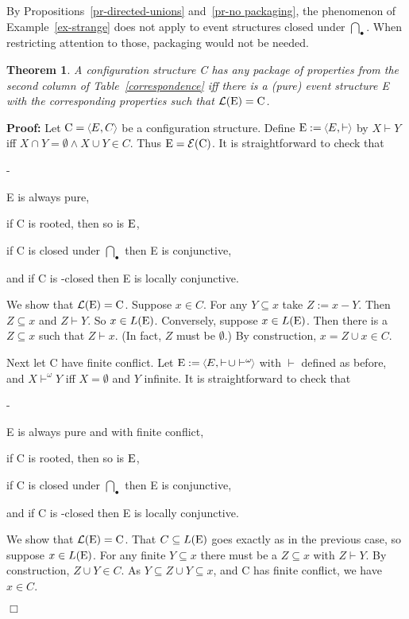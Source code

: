 \documentclass[twocolumn]{article}
\newtheorem{theo}{Theorem}
\newenvironment{theorem}[1]{\begin{theo} \rm \label{th-#1} }{\end{theo}}
\newenvironment{proof}{\begin{trivlist} \item[\hspace{\labelsep}\bf
Proof:]}{\hfill $\Box$\end{trivlist}}
\newcommand{\ex}[1]{Example~\ref{ex-#1}}
\newenvironment{itemise2}{\begin{list}{{\bf --}}{\leftmargin 15pt
                        \labelwidth\leftmargini\advance\labelwidth-\labelsep
                        \topsep 2pt \itemsep 1pt \parsep 1pt}}{\end{list}}
\newcommand{\turn}{\vdash}                              \newcommand{\dbigcup}{\bigcup_{\uparrow}}		\newcommand{\nbigcup}{\bigcup_{\bullet}}		\newcommand{\nbigcap}{\bigcap_{\bullet}}		\newcommand{\bbigcup}{\overline{\bigcup}}		\newcommand{\bbigcap}{\overline{\bigcap}}		\newcommand{\nbbigcap}{\bbigcap_{\bullet}}		\newcommand{\fbbigcup}{\overline{\bigcup}^f}		\newcommand{\bbbigcup}{\overline{\bigcup}^2}		\newcommand{\dcup}{~~\makebox[0pt]{\LARGE$\cdot$}\makebox[0pt]{$\cup$}~~}
\begin{document}
By Propositions~\ref{pr-directed-unions} and~\ref{pr-no packaging}, the phenomenon of \ex{strange}
does not apply to event structures closed under $\nbigcap$.  When
restricting attention to those, packaging would not be needed.

\begin{theorem}{CtoE}
A configuration structure C has any package of properties from the
second column of Table~\ref{correspondence} iff there is a (pure) event
structure E with the corresponding properties such that ${\cal L}({\rm E}) = {\rm C}$.
\end{theorem}

\begin{proof}
Let $\eC = \tuple{E,C}$ be a configuration structure.  Define $\eE :=
\tuple{E,\turn\;}$ by $X \turn Y$ iff $X \cap Y = \emptyset \wedge X
\cup Y \!\in\! C$. Thus ${\rm E}={\cal E}({\rm C})$. It is straightforward to check that
\begin{itemise2}
\item E is always pure,
\item if C is rooted, then so is ${\rm E}$,
\item if C is closed under $\nbigcap$ then E is conjunctive,
\item and if C is \plat{\nbbigcap}-closed then E is locally
conjunctive.
\end{itemise2}
We show that ${\cal L}({\rm E}) = {\rm C}$. Suppose $x \in C$. For any $Y \subseteq x$
take $Z := x-Y$. Then $Z \subseteq x$ and $Z \turn Y$. So $x \in L({\rm E})$.
Conversely, suppose $x \in L({\rm E})$. Then there is a $Z \subseteq x$
such that $Z \turn x$. (In fact, $Z$ must be $\emptyset$.) By
construction, $x = Z \cup x \in C$.

Next let C have finite conflict.  Let $\eE := \tuple{E,\turn \!\cup
\turn^\omega\:}$
with $\turn$ defined as before, and $X \turn^\omega Y$ iff
$X =\emptyset$ and $Y$ infinite.
It is straightforward to check that
\begin{itemise2}
\item E is always pure and with finite conflict,
\item if C is rooted, then so is ${\rm E}$,
\item if C is closed under $\nbigcap$ then E is conjunctive,
\item and if C is \plat{\nbbigcap^f}-closed then E is locally
conjunctive.
\end{itemise2}
We show that ${\cal L}({\rm E}) = {\rm C}$. That $C \subseteq L({\rm E})$ goes exactly
as in the previous case, so suppose $x \in L({\rm E})$. For any finite
$Y \subseteq x$ there must be a $Z \subseteq x$ with $Z \turn Y$.
By construction, $Z \cup Y \in C$. As $Y \subseteq Z \cup Y \subseteq
x$, and C has finite conflict, we have $x \in C$.


\end{proof}
\end{document}

